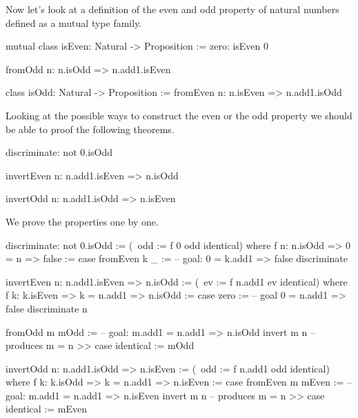 \vskip 5mm
Now let's look at a definition of the even and odd property of natural numbers
defined as a mutual type family.
%
\begin{alba}
    mutual
        class
            isEven: Natural -> Proposition
        :=
            zero: isEven 0

            fromOdd n: n.isOdd => n.add1.isEven

        class
            isOdd: Natural -> Proposition
        :=
            fromEven n: n.isEven => n.add1.isOdd
\end{alba}
%
Looking at the possible ways to construct the even or the odd property we should
be able to proof the following theorems.
%
\begin{alba}
    discriminate: not 0.isOdd

    invertEven n: n.add1.isEven => n.isOdd

    invertOdd  n: n.add1.isOdd  => n.isEven
\end{alba}


\noindent We prove the properties one by one.

\begin{alba}
    discriminate: not 0.isOdd :=
        (\ odd := f 0 odd identical)
        where
        f n: n.isOdd => 0 = n => false
        :=
            case
                fromEven k _ :=
                    -- goal: 0 = k.add1 => false
                    discriminate

    invertEven n: n.add1.isEven => n.isOdd
    :=
        (\ ev := f n.add1 ev identical)
        where
        f k: k.isEven => k = n.add1 => n.isOdd
        :=
            case
                zero :=
                    -- goal 0 = n.add1 => false
                    discriminate n

                fromOdd m mOdd :=
                    -- goal: m.add1 = n.add1 => n.isOdd
                    invert m n -- produces m = n
                    >>
                    case
                        identical := mOdd

    invertOdd n: n.add1.isOdd => n.isEven
    :=
        (\ odd := f n.add1 odd identical)
        where
        f k: k.isOdd => k = n.add1 => n.isEven
        :=
            case
                fromEven m mEven :=
                    -- goal: m.add1 = n.add1 => n.isEven
                    invert m n -- produces m = n
                    >>
                    case
                        identical := mEven
\end{alba}

